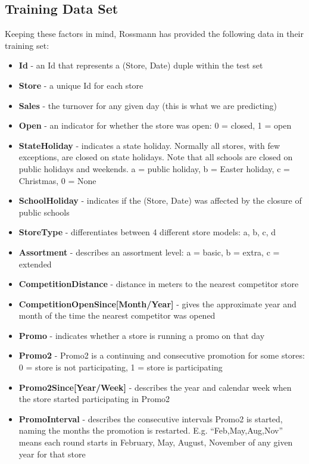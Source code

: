 \documentclass[DIV=calc, paper=a4, fontsize=11pt]{scrartcl}	 %
\begin{document}
\subsection*{Training Data Set}

Keeping these factors in mind, Rossmann has provided the following data in their training set: 
\begin{itemize}
\item \textbf{Id} - an Id that represents a (Store, Date) duple within the test set
\item \textbf{Store} - a unique Id for each store
\item \textbf{Sales} - the turnover for any given day (this is what we are predicting)
\item \textbf{Open} - an indicator for whether the store was open: 0 = closed, 1 = open
\item \textbf{StateHoliday} - indicates a state holiday. Normally all stores, with few exceptions, are closed on state holidays. Note that all schools are closed on public holidays and weekends. a = public holiday, b = Easter holiday, c = Christmas, 0 = None
\item \textbf{SchoolHoliday} - indicates if the (Store, Date) was affected by the closure of public schools
\item \textbf{StoreType} - differentiates between 4 different store models: a, b, c, d
\item \textbf{Assortment} - describes an assortment level: a = basic, b = extra, c = extended
\item \textbf{CompetitionDistance} - distance in meters to the nearest competitor store
\item \textbf{CompetitionOpenSince[Month/Year]} - gives the approximate year and month of the time the nearest competitor was opened
\item \textbf{Promo} - indicates whether a store is running a promo on that day
\item \textbf{Promo2} - Promo2 is a continuing and consecutive promotion for some stores: 0 = store is not participating, 1 = store is participating
\item \textbf{Promo2Since[Year/Week]} - describes the year and calendar week when the store started participating in Promo2
\item \textbf{PromoInterval} - describes the consecutive intervals Promo2 is started, naming the months the promotion is restarted. E.g. ``Feb,May,Aug,Nov'' means each round starts in February, May, August, November of any given year for that store\cite{RossmannKaggle}

\end{itemize}
\end{document}
